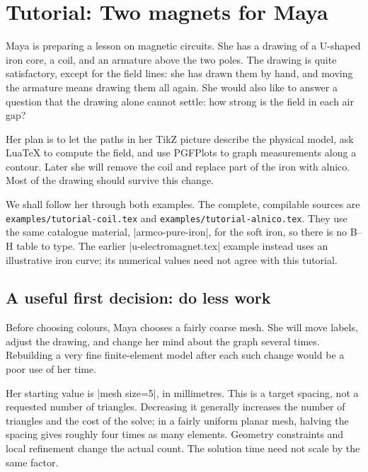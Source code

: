 \clearpage
\section{Tutorial: Two magnets for Maya}
\label{sec:tutorial}

Maya is preparing a lesson on magnetic circuits. She has a drawing of a
U-shaped iron core, a coil, and an armature above the two poles. The drawing
is quite satisfactory, except for the field lines: she has drawn them by hand,
and moving the armature means drawing them all again. She would also like to
answer a question that the drawing alone cannot settle: how strong is the
field in each air gap?

Her plan is to let the paths in her TikZ picture describe the physical model,
ask LuaTeX to compute the field, and use PGFPlots to graph measurements along
a contour. Later she will remove the coil and replace part of the iron with
alnico. Most of the drawing should survive this change.

We shall follow her through both examples. The complete, compilable sources
are \nolinkurl{examples/tutorial-coil.tex} and
\nolinkurl{examples/tutorial-alnico.tex}. They use the same catalogue material,
|armco-pure-iron|, for the soft iron, so there is no B--H table to type. The earlier
|u-electromagnet.tex| example instead uses an illustrative iron curve; its
numerical values need not agree with this tutorial.

\subsection{A useful first decision: do less work}

Before choosing colours, Maya chooses a fairly coarse mesh. She will move
labels, adjust the drawing, and change her mind about the graph several
times. Rebuilding a very fine finite-element model after each such change
would be a poor use of her time.

Her starting value is |mesh size=5|, in millimetres. This is a target spacing,
not a requested number of triangles. Decreasing it generally increases the
number of triangles and the cost of the solve; in a fairly uniform planar
mesh, halving the spacing gives roughly four times as many elements. Geometry
constraints and local refinement change the actual count. The solution time
need not scale by the same factor.

